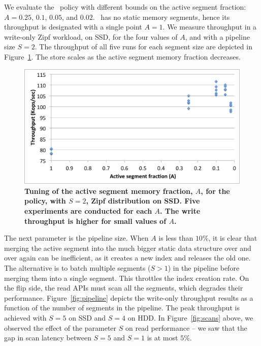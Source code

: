 We evaluate the \basic\ policy with different bounds on the active segment fraction: $A=0.25$, $0.1$, $0.05$, and $0.02$. 
\none\ has no static memory segments, hence its throughput is designated with a single point  $A=1$.
We measure  throughput in a write-only Zipf workload, on SSD,  for the four values of $A$, and with a pipeline size $S=2$.
The throughput of all five runs for each segment size are depicted in  Figure~\ref{fig:dynamic-fraction}. 
The store scales as the active segment memory fraction decreases. 

\begin{figure}[htb]
\includegraphics[width=\figw]{Figs/dynamic-fraction-1.png}
\caption{\textbf{Tuning of the active segment memory fraction, $A$, for the \basic\/ policy, with $S=2$,
Zipf distribution on SSD.  Five experiments are conducted for each $A$. 
The write throughput is higher for small values of $A$.
}}
\label{fig:dynamic-fraction}
\end{figure}

The next parameter is the pipeline size.
When $A$ is less than $10\%$, it is clear that merging the active segment into the much bigger static data structure
over and over again can be inefficient, as it creates a new index and releases the old one. 
The alternative is to batch multiple segments ($S>1$) in the pipeline before merging them into a single segment. 
This throttles the index creation rate. On the flip side, the read APIs must scan all the segments, 
which degrades their performance.
Figure~\ref{fig:pipeline} depicts the write-only throughput results as a function of the number of segments in the pipeline. 
The peak throughput is achieved with $S=5$ on SSD and $S=4$ on HDD. In Figure~\ref{fig:scans} above, we observed 
the effect of the parameter $S$ on  read performance -- we saw that the gap in scan latency between $S=5$ and $S=1$ is at most $5\%$.

